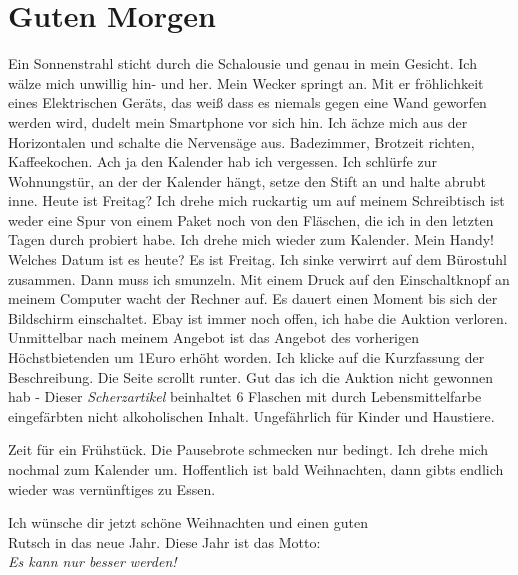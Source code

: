 \documentclass[11pt]{article}
\begin{document}
\section{Guten Morgen}
\label{sec:org63c5d3e}
Ein Sonnenstrahl sticht durch die Schalousie und genau in mein
Gesicht. Ich wälze mich unwillig hin- und her. Mein Wecker springt
an. Mit er fröhlichkeit eines Elektrischen Geräts, das weiß dass es
niemals gegen eine Wand geworfen werden wird, dudelt mein Smartphone
vor sich hin. Ich ächze mich aus der Horizontalen und schalte die
Nervensäge aus. Badezimmer, Brotzeit richten, Kaffeekochen. Ach ja den
Kalender hab ich vergessen. Ich schlürfe zur Wohnungstür, an der der
Kalender hängt, setze den Stift an und halte abrubt inne. Heute ist
Freitag? Ich drehe mich ruckartig um auf meinem Schreibtisch ist weder
eine Spur von einem Paket noch von den Fläschen, die ich in den
letzten Tagen durch probiert habe. Ich drehe mich wieder zum
Kalender. Mein Handy! Welches Datum ist es heute? Es ist Freitag. Ich
sinke verwirrt auf dem Bürostuhl zusammen. Dann muss ich smunzeln. Mit
einem Druck auf den Einschaltknopf an meinem Computer wacht der
Rechner auf. Es dauert einen Moment bis sich der Bildschirm
einschaltet. Ebay ist immer noch offen, ich habe die Auktion
verloren. Unmittelbar nach meinem Angebot ist das Angebot des
vorherigen Höchstbietenden um 1Euro erhöht worden. Ich klicke auf die
Kurzfassung der Beschreibung. Die Seite scrollt runter. Gut das ich
die Auktion nicht gewonnen hab - Dieser \emph{Scherzartikel} beinhaltet 6
Flaschen mit durch Lebensmittelfarbe eingefärbten nicht alkoholischen
Inhalt. Ungefährlich für Kinder und Haustiere. \newline

\noindent Zeit für ein Frühstück. Die Pausebrote schmecken nur
bedingt. Ich drehe mich nochmal zum Kalender um. Hoffentlich ist bald 
Weihnachten, dann gibts endlich wieder was vernünftiges zu Essen.

\begin{center}
Ich wünsche dir jetzt schöne Weihnachten und einen guten\\
Rutsch in das neue Jahr. Diese Jahr ist das Motto:\\
\emph{Es kann nur besser werden!}
\end{center}
\end{document}
